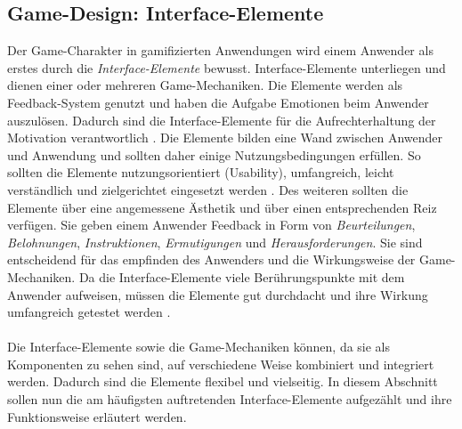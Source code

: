 \documentclass[a4paper,12pt,twoside]{scrartcl}
\begin{document}
\subsection{Game-Design: Interface-Elemente}
Der Game-Charakter in gamifizierten Anwendungen wird einem Anwender als erstes durch die \textit{Interface-Elemente} bewusst. Interface-Elemente unterliegen und dienen einer oder mehreren Game-Mechaniken. Die Elemente werden als Feedback-System genutzt und haben die Aufgabe Emotionen beim Anwender auszulösen. Dadurch sind die Interface-Elemente für die Aufrechterhaltung der Motivation verantwortlich \cite{Mcgonigal2011}. Die Elemente bilden eine Wand zwischen Anwender und Anwendung \cite{Schell2014} und sollten daher einige Nutzungsbedingungen erfüllen. So sollten die Elemente nutzungsorientiert (Usability), umfangreich, leicht verständlich und zielgerichtet eingesetzt werden \cite{Schell2014}. Des weiteren sollten die Elemente über eine angemessene Ästhetik und über einen entsprechenden Reiz verfügen. Sie geben einem Anwender Feedback in Form von \textit{Beurteilungen}, \textit{Belohnungen}, \textit{Instruktionen}, \textit{Ermutigungen} und \textit{Herausforderungen}. Sie sind entscheidend für das empfinden des Anwenders und die Wirkungsweise der Game-Mechaniken. Da die Interface-Elemente viele Berührungspunkte mit dem Anwender aufweisen, müssen die Elemente gut durchdacht und ihre Wirkung umfangreich getestet werden \cite{Schell2014}.
\\\\
Die Interface-Elemente sowie die Game-Mechaniken können, da sie als Komponenten zu sehen sind, auf verschiedene Weise kombiniert und integriert werden. Dadurch sind die Elemente flexibel und vielseitig. In diesem Abschnitt sollen nun die am häufigsten auftretenden Interface-Elemente aufgezählt und ihre Funktionsweise erläutert werden. 
\end{document}
